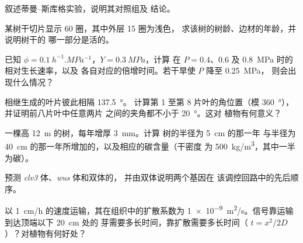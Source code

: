 \begin{exercise}[$\star$]\label{exo:b2:plant-meristems:3}
叙述蒂曼–斯库格实验，说明其对照组及
结论。
\end{exercise}

\begin{exercise}[$\star$]\label{exo:b2:plant-meristems:4}
某树干切片显示 60 圈，其中外层 15 圈为浅色，
求该树的树龄、边材的年龄，并说明树干的
哪一部分是活的。
\end{exercise}

\begin{exercise}[$\star\star$]\label{exo:b2:plant-meristems:5}
已知 $\phi = \qty{0.1}{h^{-1}.MPa^{-1}}$，$Y = \qty{0.3}{MPa}$，计算
在 $P = 0.4$、$0.6$ 及 \qty{0.8}{MPa} 时的相对生长速率，以及
各自对应的倍增时间。若干旱使 $P$ 降至 \qty{0.25}{MPa}，
则会出现什么情况？
\end{exercise}

\begin{exercise}[$\star\star$]\label{exo:b2:plant-meristems:6}
相继生成的叶片彼此相隔 \qty{137.5}{\degree}。
计算第 1 至第 8 片叶的角位置（模
\qty{360}{\degree}），并证明前八片叶中任意两片
之间的夹角都不小于 \qty{20}{\degree}。这对
植物有何意义？
\end{exercise}

\begin{exercise}[$\star\star$]\label{exo:b2:plant-meristems:7}
一棵高 \qty{12}{m} 的树，每年增厚 \qty{3}{mm}。计算
树的半径为 \qty{5}{cm} 的那一年
与半径为 \qty{40}{cm} 的那一年所增加的，以及相应的碳含量（干密度
为 \qty{500}{kg/m^3}，其中一半为碳）。
\end{exercise}

\begin{exercise}[$\star\star$]\label{exo:b2:plant-meristems:8}
预测 \emph{clv3} 体、\emph{wus} 体和双体的，
并由双体说明两个基因在
该调控回路中的先后顺序。
\end{exercise}

\begin{exercise}[$\star\star$]\label{exo:b2:plant-meristems:9}
以 \qty{1}{cm/h} 的速度运输，其在组织中的扩散系数为
\qty{1e-9}{m^2/s}。信号靠运输到达顶端以下 \qty{20}{cm} 处的
芽需要多长时间，靠扩散需要多长时间（
$t = x^2/2D$）？对植物有何好处？
\end{exercise}

